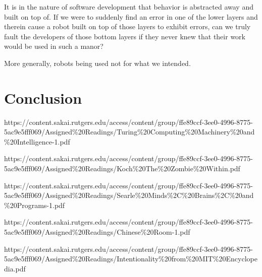 \documentclass[12]{article}
\begin{document}
	It is in the nature of software development that behavior is abstracted away and built on top of. If we were to suddenly find an error in one of the lower layers and therein cause a robot built on top of those layers to exhibit errors, can we truly fault the developers of those bottom layers if they never knew that their work would be used in such a manor? 
	
	More generally, robots being used not for what we intended.	

\section{Conclusion}

\newpage

\begin{thebibliography}{6}

https://content.sakai.rutgers.edu/access/content/group/ffe89ccf-3ee0-4996-8775-5ac9e5fff069/Assigned\%20Readings/Turing\%20Computing\%20Machinery\%20and\%20Intelligence-1.pdf

https://content.sakai.rutgers.edu/access/content/group/ffe89ccf-3ee0-4996-8775-5ac9e5fff069/Assigned\%20Readings/Koch\%20The\%20Zombie\%20Within.pdf

https://content.sakai.rutgers.edu/access/content/group/ffe89ccf-3ee0-4996-8775-5ac9e5fff069/Assigned\%20Readings/Searle\%20Minds\%2C\%20Brains\%2C\%20and\%20Programs-1.pdf

https://content.sakai.rutgers.edu/access/content/group/ffe89ccf-3ee0-4996-8775-5ac9e5fff069/Assigned\%20Readings/Chinese\%20Room-1.pdf

https://content.sakai.rutgers.edu/access/content/group/ffe89ccf-3ee0-4996-8775-5ac9e5fff069/Assigned\%20Readings/Intentionality\%20from\%20MIT\%20Encyclopedia.pdf

\end{thebibliography}
\end{document}
